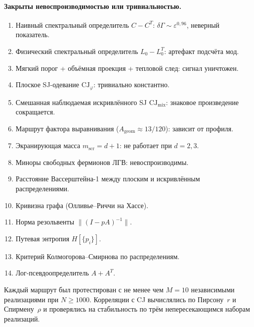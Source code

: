 \documentclass[12pt,a4paper]{article}
\theoremstyle{plain}
\theoremstyle{definition}
\theoremstyle{remark}
\newcommand{\CJ}{\mathrm{CJ}}
\begin{document}
\paragraph{Закрыты невоспроизводимостью или тривиальностью.}
\begin{enumerate}[resume]
\item Наивный спектральный определитель $C - C^T$:
  $\delta\Gamma \sim \varepsilon^{0{,}96}$, неверный показатель.
\item Физический спектральный определитель $L_0 - L_0^T$:
  артефакт подсчёта мод.
\item Мягкий порог + объёмная проекция + тепловой след:
  сигнал уничтожен.
\item Плоское SJ-одевание $\CJ_\varphi$: тривиально
  константно.
\item Смешанная наблюдаемая искривлённого SJ
  $\CJ_{\mathrm{mix}}$: знаковое произведение сокращается.
\item Маршрут фактора выравнивания
  ($A_{\mathrm{geom}} \approx 13/120$): зависит от профиля.
\item Экранирующая масса $m_{\mathrm{scr}} = d+1$: не
  работает при $d = 2, 3$.
\item Миноры свободных фермионов ЛГВ: невоспроизводимы.
\item Расстояние Вассерштейна-1 между плоским и
  искривлённым распределениями.
\item Кривизна графа (Олливье--Риччи на Хассе).
\item Норма резольвенты $\|(I - pA)^{-1}\|$.
\item Путевая энтропия $H[\{p_i\}]$.
\item Критерий Колмогорова--Смирнова по распределениям.
\item Лог-псевдоопределитель $A + A^T$.
\end{enumerate}

Каждый маршрут был протестирован с не менее чем
$M = 10$ независимыми реализациями при $N \geq 1000$.
Корреляции с CJ вычислялись по Пирсону~$r$ и
Спирмену~$\rho$ и проверялись на стабильность по трём
непересекающимся наборам реализаций.

\end{document}
